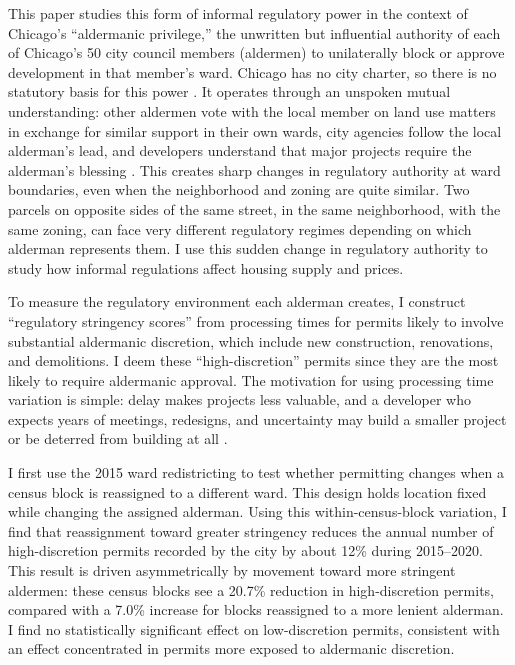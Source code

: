 This paper studies this form of informal regulatory power in the context of Chicago's ``aldermanic privilege,'' the unwritten but influential authority of each of Chicago's 50 city council members (aldermen) to unilaterally block or approve development in that member's ward.
Chicago has no city charter, so there is no statutory basis for this power \citep{mcclintock_what_2025}.
It operates through an unspoken mutual understanding: other aldermen vote with the local member on land use matters in exchange for similar support in their own wards, city agencies follow the local alderman's lead, and developers understand that major projects require the alderman's blessing \citep{thale_aldermanic_2005, einstein_neighborhood_2019, khan_decentralized_2021}.
This creates sharp changes in regulatory authority at ward boundaries, even when the neighborhood and zoning are quite similar.
Two parcels on opposite sides of the same street, in the same neighborhood, with the same zoning, can face very different regulatory regimes depending on which alderman represents them.
I use this sudden change in regulatory authority to study how informal regulations affect housing supply and prices.

To measure the regulatory environment each alderman creates, I construct ``regulatory stringency scores'' from processing times for permits likely to involve substantial aldermanic discretion, which include new construction, renovations, and demolitions.
I deem these ``high-discretion'' permits since they are the most likely to require aldermanic approval.
The motivation for using processing time variation is simple: delay makes projects less valuable, and
a developer who expects years of meetings, redesigns, and uncertainty may build a smaller project or be deterred from building at all \citep{kydland_time_1982, mayer_land_2000, paciorek_supply_2013, gyourko_local_2021, soltas_how_2026}.

I first use the 2015 ward redistricting to test whether permitting changes when a census block is reassigned to a different ward.
This design holds location fixed while changing the assigned alderman.
Using this within-census-block variation,
I find that reassignment toward greater stringency reduces the annual number of high-discretion permits recorded by the city by about 12\% during 2015--2020.
This result is driven asymmetrically by movement toward more stringent aldermen: these census blocks see a 20.7\% reduction in high-discretion permits, compared with a 7.0\% increase for blocks reassigned to a more lenient alderman.
I find no statistically significant effect on low-discretion permits, consistent with an effect concentrated in permits more exposed to aldermanic discretion.

